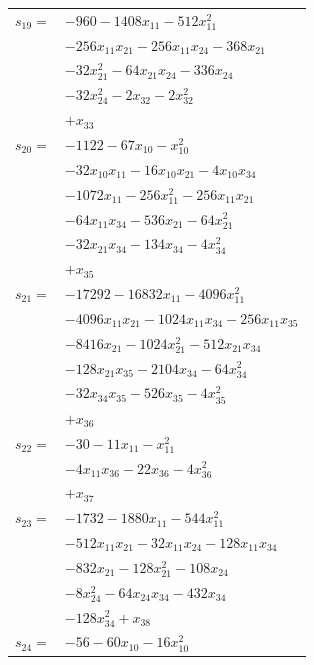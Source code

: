 \begin{longtable}{@{}r@{\;}l@{}}
\(s_{19}=\) & \(\displaystyle -960 -1408x_{11} -512x_{11}^{2}\) \\
 & \(\displaystyle -256x_{11}x_{21} -256x_{11}x_{24} -368x_{21}\) \\
 & \(\displaystyle -32x_{21}^{2} -64x_{21}x_{24} -336x_{24}\) \\
 & \(\displaystyle -32x_{24}^{2} -2x_{32} -2x_{32}^{2}\) \\
 & \(\displaystyle +x_{33}\) \\[3pt]
\(s_{20}=\) & \(\displaystyle -1122 -67x_{10} -x_{10}^{2}\) \\
 & \(\displaystyle -32x_{10}x_{11} -16x_{10}x_{21} -4x_{10}x_{34}\) \\
 & \(\displaystyle -1072x_{11} -256x_{11}^{2} -256x_{11}x_{21}\) \\
 & \(\displaystyle -64x_{11}x_{34} -536x_{21} -64x_{21}^{2}\) \\
 & \(\displaystyle -32x_{21}x_{34} -134x_{34} -4x_{34}^{2}\) \\
 & \(\displaystyle +x_{35}\) \\[3pt]
\(s_{21}=\) & \(\displaystyle -17292 -16832x_{11} -4096x_{11}^{2}\) \\
 & \(\displaystyle -4096x_{11}x_{21} -1024x_{11}x_{34} -256x_{11}x_{35}\) \\
 & \(\displaystyle -8416x_{21} -1024x_{21}^{2} -512x_{21}x_{34}\) \\
 & \(\displaystyle -128x_{21}x_{35} -2104x_{34} -64x_{34}^{2}\) \\
 & \(\displaystyle -32x_{34}x_{35} -526x_{35} -4x_{35}^{2}\) \\
 & \(\displaystyle +x_{36}\) \\[3pt]
\(s_{22}=\) & \(\displaystyle -30 -11x_{11} -x_{11}^{2}\) \\
 & \(\displaystyle -4x_{11}x_{36} -22x_{36} -4x_{36}^{2}\) \\
 & \(\displaystyle +x_{37}\) \\[3pt]
\(s_{23}=\) & \(\displaystyle -1732 -1880x_{11} -544x_{11}^{2}\) \\
 & \(\displaystyle -512x_{11}x_{21} -32x_{11}x_{24} -128x_{11}x_{34}\) \\
 & \(\displaystyle -832x_{21} -128x_{21}^{2} -108x_{24}\) \\
 & \(\displaystyle -8x_{24}^{2} -64x_{24}x_{34} -432x_{34}\) \\
 & \(\displaystyle -128x_{34}^{2} +x_{38}\) \\[3pt]
\(s_{24}=\) & \(\displaystyle -56 -60x_{10} -16x_{10}^{2}\) \\

\end{longtable}
